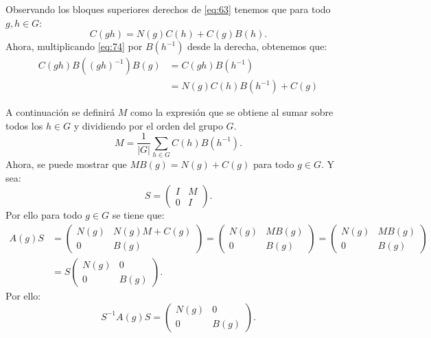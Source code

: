 \documentclass[12pt]{book}
\theoremstyle{definition}
\newcounter{in}
\newcounter{ini}
\newcommand{\rep}{A}
\begin{document}
Observando los bloques superiores derechos de \ref{eq:63} tenemos que
para todo $g,h \in G$:
\begin{equation}
  \label{eq:74}
  C(gh)=N(g)C(h)+C(g)B(h). 
\end{equation}
Ahora, multiplicando \ref{eq:74} por $B(h^{-1})$ desde la derecha,
obtenemos que:
\begin{equation}
  \label{eq:75}
  \begin{aligned}
C(gh)B((gh)^{-1})B(g) &= C(gh)B(h^{-1}) \\
&= N(g)C(h)B(h^{-1})+C(g)
    \end{aligned}
\end{equation}

A continuación se definirá $M$ como la expresión que se obtiene al
sumar sobre todos los $h \in G$ y dividiendo por el orden del grupo
$G$.
\begin{equation}
  \label{eq:76}
  M=\frac{1}{|G|} \sum_{h \in G} C(h)B(h^{-1}).
\end{equation}
Ahora, se puede mostrar que $MB(g)=N(g)+C(g)$ para todo $g \in G$. Y sea:
\begin{equation}
  \label{eq:77}
   S =
    \begin{pmatrix}
    I & M \\
    0 & I
  \end{pmatrix}.
\end{equation}
Por ello para todo $g \in G$ se tiene que:
\begin{equation}
  \label{eq:78}
    \begin{aligned}
  \rep(g)S &=
  \begin{pmatrix}
    N(g) & N(g)M+C(g) \\
    0 & B(g)
  \end{pmatrix}
  =
    \begin{pmatrix}
    N(g) & MB(g) \\
    0 & B(g)
  \end{pmatrix}
  =
    \begin{pmatrix}
    N(g) & MB(g) \\
    0 & B(g)
  \end{pmatrix} \\
  & = S
    \begin{pmatrix}
    N(g) & 0 \\
    0 & B(g)
  \end{pmatrix}.
\end{aligned}
\end{equation}
Por ello:
\begin{equation}
  \label{eq:79}
  S^{-1}\rep(g)S=
    \begin{pmatrix}
    N(g) & 0 \\
    0 & B(g)
  \end{pmatrix}.
\end{equation}
\end{document}
